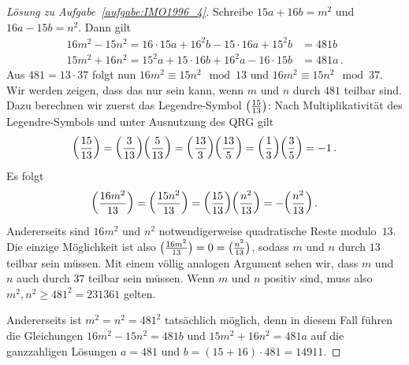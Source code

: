 \begin{proof}[Lösung zu Aufgabe~\ref{aufgabe:IMO1996_4}]
	Schreibe $15a+16b=m^2$ und $16a-15b=n^2$. Dann gilt
	\begin{align*}
		16m^2-15n^2=16\cdot 15a+16^2b-15\cdot 16a+15^2b&=481b\\
		15m^2+16n^2=15^2a+15\cdot 16b+ 16^2a-16\cdot 15b&=481a\,.
	\end{align*}
	Aus $481=13\cdot 37$ folgt nun $16m^2\equiv 15n^2\mod 13$ und $16m^2\equiv 15n^2\mod 37$. Wir werden zeigen, dass das nur sein kann, wenn $m$ und $n$ durch $481$ teilbar sind. Dazu berechnen wir zuerst das Legendre-Symbol $\parens[\big]{\frac{15}{13}}$: Nach Multiplikativität des Legendre-Symbols und unter Ausnutzung des QRG gilt
	\begin{equation*}
		\parens*{\frac{15}{13}}= \parens*{\frac{3}{13}}\parens*{\frac{5}{13}}=\parens*{\frac{13}{3}}\parens*{\frac{13}{5}}=\parens*{\frac{1}{3}}\parens*{\frac{3}{5}}=-1\,.
	\end{equation*}
	Es folgt
	\begin{equation*}
		\parens*{\frac{16m^2}{13}}=\parens*{\frac{15n^2}{13}}=\parens*{\frac{15}{13}}\parens*{\frac{n^2}{13}}=-\parens*{\frac{n^2}{13}}\,.
	\end{equation*}
	Andererseits sind $16m^2$ und $n^2$ notwendigerweise quadratische Reste modulo~$13$. Die einzige Möglichkeit ist also $\parens[\big]{\frac{16m^2}{13}}=0=\parens[\big]{\frac{n^2}{13}}$, sodass $m$ und $n$ durch $13$ teilbar sein müssen. Mit einem völlig analogen Argument sehen wir, dass $m$ und $n$ auch durch $37$ teilbar sein müssen. Wenn $m$ und $n$ positiv sind, muss also $m^2,n^2\geqslant 481^2=231361$ gelten.
	
	Andererseits ist $m^2=n^2=481^2$ tatsächlich möglich, denn in diesem Fall führen die Gleichungen $16m^2-15n^2=481b$ und $15m^2+16n^2=481a$ auf die ganzzahligen Lösungen $a=481$ und $b=(15+16)\cdot 481=14911$.
\end{proof}

